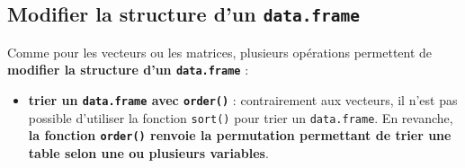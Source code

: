 \documentclass[12pt,twosided, notitlepage]{book}
\newenvironment{Shaded}{}{}
\newcommand{\KeywordTok}[1]{\textcolor[rgb]{0.00,0.00,1.00}{{#1}}}
\newcommand{\StringTok}[1]{\textcolor[rgb]{0.00,0.50,0.50}{{#1}}}
\newcommand{\CommentTok}[1]{\textcolor[rgb]{0.00,0.50,0.00}{{#1}}}
\newcommand{\NormalTok}[1]{{#1}}
\providecommand{\tightlist}{%
  \setlength{\itemsep}{0pt}\setlength{\parskip}{0pt}}
\newif \ifsol
\renewenvironment{Shaded}{\begin{snugshade}}{\end{snugshade}}
\begin{document}
\begin{enumerate}
\begin{enumerate}
    \ifsol 

    \begin{center} \rule{0.5\linewidth}{\linethickness}\end{center}

\begin{Shaded}
\begin{Highlighting}[]
\CommentTok{# On utilise la valeur de seuil pour créer une version}
\CommentTok{# modifiée de la pondération (par exemple avec ifelse())}
\NormalTok{eec$newpond <-}\StringTok{ }\KeywordTok{ifelse}\NormalTok{(}
  \NormalTok{eec$extri1613 >}\StringTok{ }\NormalTok{seuil}
  \NormalTok{, seuil}
  \NormalTok{, eec$extri1613}
\NormalTok{)}

\CommentTok{# Caractéristiques générales de newpond}
\KeywordTok{summary}\NormalTok{(eec$newpond)}
  \NormalTok{##    Min. 1st Qu.  Median    Mean 3rd Qu.    Max. }
  \NormalTok{##   156.4  1088.2  1334.6  1419.0  1636.8  3958.6}
\end{Highlighting}
\end{Shaded}

    \begin{center} \rule{0.5\linewidth}{\linethickness}\end{center}

    \bigskip  \fi 
  \end{enumerate}
\end{enumerate}

\subsection{\texorpdfstring{Modifier la structure d'un
\texttt{data.frame}}{Modifier la structure d'un data.frame}}\label{modifier-la-structure-dun-data.frame}

Comme pour les vecteurs ou les matrices, plusieurs opérations permettent
de \textbf{modifier la structure d'un \texttt{data.frame}} :

\begin{itemize}
\tightlist
\item
  \textbf{trier un \texttt{data.frame} avec
  \texttt{order()}} : contrairement aux
  vecteurs, il n'est pas possible d'utiliser la fonction \texttt{sort()}
  pour trier un \texttt{data.frame}. En revanche, \textbf{la fonction
  \texttt{order()} renvoie la permutation permettant de trier une table
  selon une ou plusieurs variables}.
\end{itemize}
\end{document}
